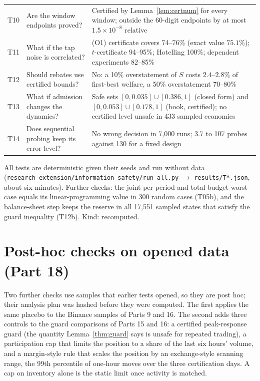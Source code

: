 \documentclass[12pt]{article}
\theoremstyle{definition}
\theoremstyle{remark}
\begin{document}
\begin{table}[!tbp]
\begin{threeparttable}
\begin{tabular}{p{}p{}p{}}
T10 & Are the window endpoints proved? & Certified by Lemma~\ref{lem:certnum} for every window; outside the 60-digit endpoints by at most $1.5\times10^{-8}$ relative\\
T11 & What if the tap noise is correlated? & (O1) certificate covers 74--76\% (exact value $75.1\%$); $t$-certificate 94--95\%; Hotelling 100\%; dependent experiments 82--85\%\\
T12 & Should rebates use certified bounds? & No: a 10\% overstatement of $S$ costs $2.4$--$2.8\%$ of first-best welfare, a 50\% overstatement $70$--$80\%$\\
T13 & What if admission changes the dynamics? & Safe sets $[0,0.035]\cup[0.386,1]$ (closed form) and $[0,0.053]\cup[0.178,1]$ (book, certified); no certified level unsafe in 433 sampled economies\\
T14 & Does sequential probing keep its error level? & No wrong decision in 7{,}000 runs; 3.7 to 107 probes against 130 for a fixed design\\
\bottomrule
\end{tabular}
\begin{tablenotes}\footnotesize\item All tests are deterministic given their seeds and run without data (\texttt{research\_extension/information\_safety/run\_all.py} $\to$ \texttt{results/T*.json}, about six minutes). Further checks: the joint per-period and total-budget worst case equals its linear-programming value in 300 random cases (T05b), and the balance-sheet step keeps the reserve in all 17{,}551 sampled states that satisfy the guard inequality (T12b). Kind: recomputed. \end{tablenotes}
\end{threeparttable}
\end{table}
\section{Post-hoc checks on opened data (Part 18)}
Two further checks use samples that earlier tests opened, so they are post hoc; their analysis plan was hashed before they were computed. The first applies the same placebo to the Binance samples of Parts 9 and 16. The second adds three controls to the guard comparisons of Parts 15 and 16: a certified peak-response guard (the quantity Lemma~\ref{thm:guard} says is unsafe for repeated trading), a participation cap that limits the position to a share of the last six hours' volume, and a margin-style rule that scales the position by an exchange-style scanning range, the 99th percentile of one-hour moves over the three certification days. A cap on inventory alone is the static limit once activity is matched.
\end{document}
